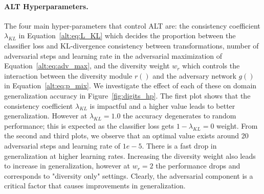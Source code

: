 

\paragraph{ALT Hyperparameters.}
The four main hyper-parameters that control ALT are: the consistency coefficient $\lambda_{KL}$ in Equation~\ref{alt:eq:L_KL} which decides the proportion between the classifier loss and KL-divergence consistency between transformations, 
number of adversarial steps and learning rate in the adversarial maximization of Equation~\ref{alt:eq:adv_max}, and the diversity weight $w_r$ which controls the interaction between the diversity module $r()$ and the adversary network $g()$ in Equation~\ref{alt:eq:p_mix}.
We investigate the effect of each of these on domain generalization accuracy in Figure~\ref{fig:digits_hp}.
The first plot shows that the consistency coefficient $\lambda_{KL}$ is impactful and a higher value leads to better generalization.
However at $\lambda_{KL}=1.0$ the accuracy degenerates to random performance; this is expected as the classifier loss gets $1-\lambda_{KL}{=}0$ weight.
From the second and third plots, we observe that an optimal value exists around 20 adversarial steps and learning rate of $1e{-}5$.
There is a fast drop in generalization at higher learning rates.
Increasing the diversity weight also leads to increase in generalization, however at $w_r{=}2$ the performance drops and corresponds to "diversity only" settings.
Clearly, the adversarial component is a critical factor that causes improvements in generalization.



